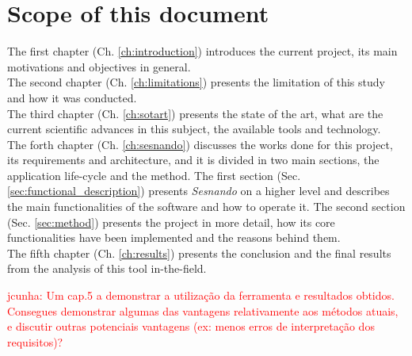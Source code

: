 \section{Scope of this document}
\label{sec:document_scope}

The first chapter (Ch. \ref{ch:introduction}) introduces the current project, its main motivations and objectives in general.\\
The second chapter (Ch. \ref{ch:limitations}) presents the limitation of this study and how it was conducted.\\
The third chapter (Ch. \ref{ch:sotart}) presents the state of the art, what are the current scientific advances in this subject, the available tools and technology.\\
The forth chapter (Ch. \ref{ch:sesnando}) discusses the works done for this project, its requirements and architecture, and it is divided in two main sections, the application life-cycle and the method. The first section (Sec. \ref{sec:functional_description}) presents \textit{Sesnando} on a higher level and describes the main functionalities of the software and how to operate it. The second section (Sec. \ref{sec:method}) presents the project in more detail, how its core functionalities have been implemented and the reasons behind them.\\
The fifth chapter (Ch. \ref{ch:results}) presents the conclusion and the final results from the analysis of this tool in-the-field.

\textcolor{red}{jcunha: Um cap.5 a demonstrar a utilização da ferramenta e resultados obtidos. 
Consegues demonstrar algumas das vantagens relativamente aos métodos atuais, e discutir outras potenciais vantagens (ex: menos erros de interpretação dos requisitos)?}
